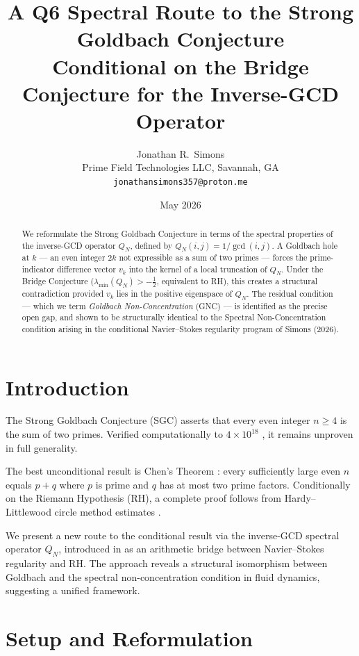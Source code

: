 \documentclass[11pt]{article}
\title{\textbf{A Q6 Spectral Route to the Strong Goldbach Conjecture}\\
\large Conditional on the Bridge Conjecture for the Inverse-GCD Operator}
\author{Jonathan R.\ Simons\\
\small Prime Field Technologies LLC, Savannah, GA\\
\small \texttt{jonathansimons357@proton.me}}
\date{May 2026}
\begin{document}
\maketitle

\begin{abstract}
We reformulate the Strong Goldbach Conjecture in terms of the spectral 
properties of the inverse-GCD operator $Q_N$, defined by $Q_N(i,j) = 1/\gcd(i,j)$.
A Goldbach hole at $k$ --- an even integer $2k$ not expressible as a sum of two primes ---
forces the prime-indicator difference vector $v_k$ into the kernel of a local 
truncation of $Q_N$. Under the Bridge Conjecture ($\lambda_{\min}(Q_N) > -\tfrac{1}{2}$,
equivalent to RH), this creates a structural contradiction provided $v_k$ 
lies in the positive eigenspace of $Q_N$. The residual condition --- which we term
\emph{Goldbach Non-Concentration} (GNC) --- is identified as the precise open gap,
and shown to be structurally identical to the Spectral Non-Concentration condition
arising in the conditional Navier--Stokes regularity program of Simons (2026).
\end{abstract}

\section{Introduction}

The Strong Goldbach Conjecture (SGC) asserts that every even integer $n \geq 4$
is the sum of two primes. Verified computationally to $4 \times 10^{18}$
\cite{oliveira2013}, it remains unproven in full generality.

The best unconditional result is Chen's Theorem \cite{chen1973}: every sufficiently 
large even $n$ equals $p + q$ where $p$ is prime and $q$ has at most two prime factors.
Conditionally on the Riemann Hypothesis (RH), a complete proof follows from 
Hardy--Littlewood circle method estimates \cite{hardylittlewood1923}.

We present a new route to the conditional result via the inverse-GCD spectral 
operator $Q_N$, introduced in \cite{simons2026bridge} as an arithmetic bridge 
between Navier--Stokes regularity and RH. The approach reveals a structural 
isomorphism between Goldbach and the spectral non-concentration condition in 
fluid dynamics, suggesting a unified framework.

\section{Setup and Reformulation}
\end{document}
